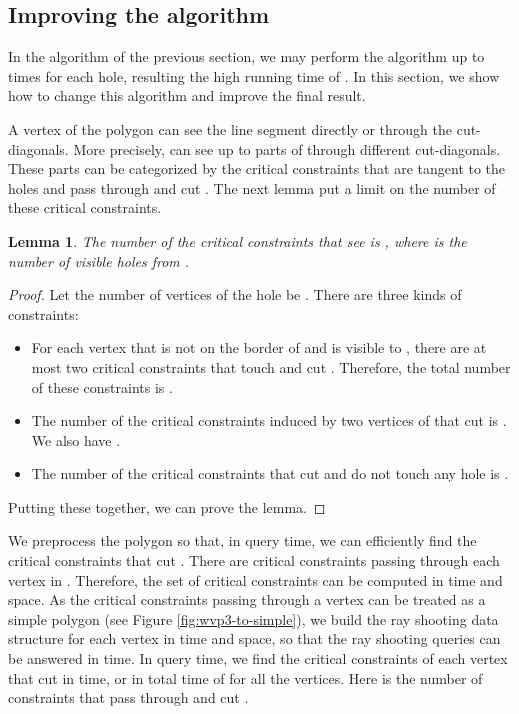 \documentclass[5p]{elsarticle}
\newtheorem{lemma}[theorem]{Lemma}
\begin{document}
\subsection{Improving the algorithm}

In the algorithm of the previous section, we may perform the  algorithm
up to  times for each hole, resulting the high running time of . 
In this section, we show how to change this algorithm and improve the final result. 

A vertex  of the polygon  can see the line segment  directly or through the 
cut-diagonals. More precisely,  can see up to  parts of  through different cut-diagonals. 
These parts can be categorized by the critical constraints that are tangent to the holes
and pass through  and cut . The next lemma put a limit on the number of these critical 
constraints.

\begin{lemma}
The number of the critical constraints that see  is , where
 is the number of visible holes from .
\end{lemma}
\begin{proof}
Let the number of vertices of the hole  be . 
There are three kinds of constraints: 
\begin{itemize}
\item For each vertex  that is not on the 
border of  and is visible to , there are at most two critical constraints that 
touch  and cut . Therefore, the total number of these constraints is .
\item The number of the critical constraints 
induced by two vertices of  that cut  is . We also have .
\item The number of the critical constraints that cut  and do not touch any hole is 
 \cite{bose}.
\end{itemize}
Putting these together, we can prove the lemma.
\end{proof}


We preprocess the polygon  so that, in query time, we can efficiently 
find the critical constraints that cut .
There are  critical constraints passing through each vertex in .
Therefore, the set of critical constraints can be computed in  time and 
 space. 
As the critical constraints passing through a vertex can be treated as a simple polygon 
(see Figure \ref{fig:wvp3-to-simple}),
we build the ray shooting data structure for each vertex in  time and space, so
that the ray shooting queries can be answered in  time.
In query time, we find the critical constraints of each vertex that cut  in  time,
or in total time of  for all the vertices. Here  is the number of 
constraints that pass through  and cut .
\end{document}
